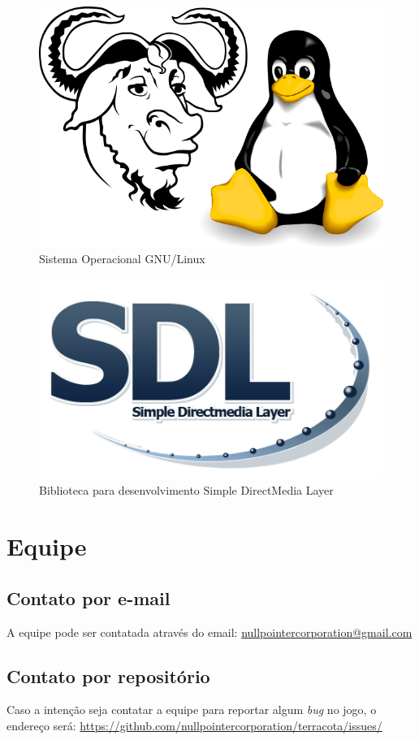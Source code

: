 \documentclass[11pt]{article}
\begin{document}
\begin{figure}[!htp]
\centering
\includegraphics[scale=0.75]{logo-gnu-linux.png}
\caption{Sistema Operacional GNU/Linux}
\label{GNU/Linux logo}
\end{figure}

\begin{figure}[!htp]
\centering
\includegraphics[scale=0.75]{logo-sdl.png}
\caption{Biblioteca para desenvolvimento Simple DirectMedia Layer}
\label{SDL logo}
\end{figure}

\section{Equipe}
\subsection{Contato por e-mail}
A equipe pode ser contatada através do email: \url{nullpointercorporation@gmail.com}

\subsection{Contato por repositório}
Caso a intenção seja contatar a equipe para reportar algum \textit{bug} no jogo, o endereço será: \url{https://github.com/nullpointercorporation/terracota/issues/}
\newpage
\end{document}

